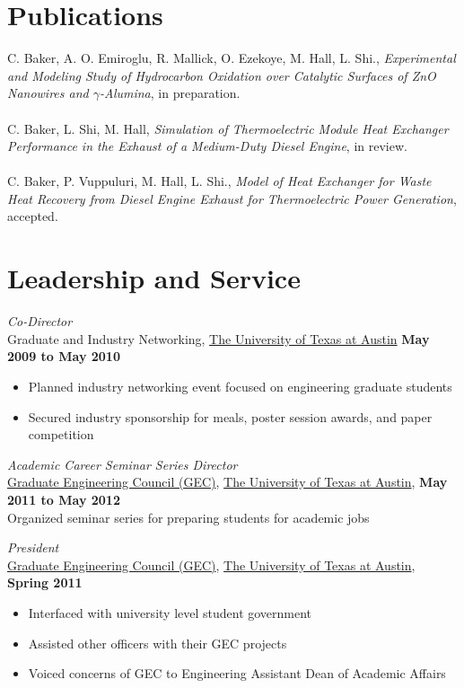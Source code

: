 \documentclass[centered]{res}
\begin{document}
\begin{resume}
\section{Publications}

C. Baker, A. O. Emiroglu, R. Mallick, O. Ezekoye, M. Hall, L. Shi.,
\textit{Experimental and Modeling Study of Hydrocarbon Oxidation over
  Catalytic Surfaces of ZnO Nanowires and $\gamma$-Alumina}, in
preparation. \\
\vspace{-5pt} \\
%
C. Baker, L. Shi, M. Hall, \textit{Simulation of Thermoelectric
  Module Heat Exchanger Performance in the Exhaust of a Medium-Duty
  Diesel Engine}, in review.  \\
\vspace{-5pt} \\
%
C. Baker, P. Vuppuluri, M. Hall, L. Shi., \textit{Model of Heat
  Exchanger for Waste Heat Recovery from Diesel Engine Exhaust for
  Thermoelectric Power Generation}, accepted.  

\newpage
\section{Leadership and Service}
\textit{Co-Director} \\
Graduate and Industry Networking,
\href{http://www.utexas.edu}{The University of Texas at Austin}
\hfill \textbf{May 2009 to May 2010}
\begin{itemize} \itemsep -2pt %
\item Planned industry networking event focused on engineering
  graduate students
\item Secured industry sponsorship for meals, poster session awards,
  and paper competition
\end{itemize}

\textit{Academic Career Seminar Series Director} \\
\href{http://sites.google.com/site/utexasgecouncil/}{Graduate Engineering Council (GEC)},
\href{http://www.utexas.edu}{The University of Texas at Austin},
\hfill \textbf{May 2011 to May 2012} \\ 
Organized seminar series for preparing students for academic jobs

\textit{President} \\
\href{http://sites.google.com/site/utexasgecouncil/}{Graduate Engineering Council (GEC)},
\href{http://www.utexas.edu}{The University of Texas at Austin},
\hfill \textbf{Spring 2011}
\begin{itemize} \itemsep -2pt %
\item Interfaced with university level student government
\item Assisted other officers with their GEC projects
\item Voiced concerns of GEC to Engineering Assistant Dean of Academic
  Affairs 
\end{itemize}


\end{resume}
\end{document}
